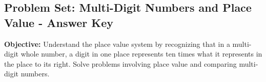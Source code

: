 \documentclass[12pt]{article}
\title{}
\date{}
\begin{document}
\subsection*{Problem Set: Multi-Digit Numbers and Place Value - Answer Key}
\onehalfspacing

\begin{tcolorbox}[colframe=black!40, colback=gray!5, 
coltitle=black, colbacktitle=black!20, fonttitle=\bfseries\Large, 
title=Learning Objective, halign title=center, left=5pt, right=5pt, top=5pt, bottom=15pt]
\textbf{Objective:} Understand the place value system by recognizing that in a multi-digit whole number, a digit in one place represents ten times what it represents in the place to its right. Solve problems involving place value and comparing multi-digit numbers.
\end{tcolorbox}
\end{document}
